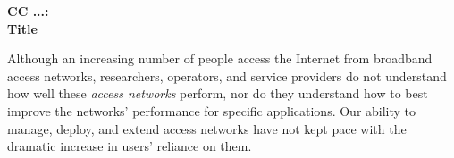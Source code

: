 \begin{center}
{\large \bf CC ...: \\ Title}
\end{center}

Although an increasing number of people access the Internet from
broadband access networks, researchers, operators, and service
providers do not understand how well these \textit{access networks}
perform, nor do they understand how to best improve the networks'
performance for specific applications.  Our ability to manage, deploy,
and extend access networks have not kept pace with the dramatic increase
in users' reliance on them.



